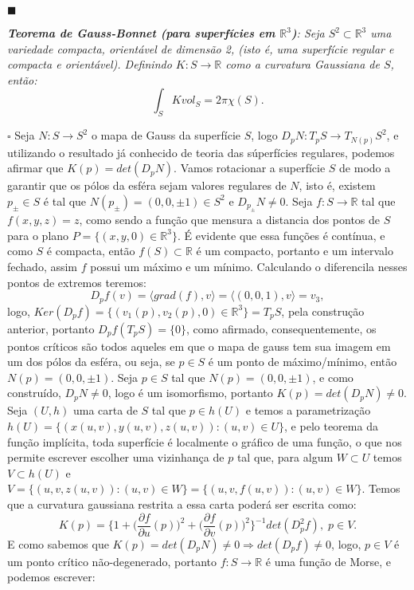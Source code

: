 \documentclass{article}
\begin{document}
	$\blacksquare$
	
	\vspace{2mm}
	\textit{\textbf{Teorema de Gauss-Bonnet (para superfícies em $\mathbb{R}^{3}$)}: Seja $S^{2} \subset \mathbb{R}^{3}$ uma variedade compacta, orientável de dimensão 2, (isto é, uma superfície regular e compacta e orientável). Definindo $K:S \to \mathbb{R}$ como a curvatura Gaussiana de $S$, então:}
	$$
	\int_{S} K vol_{S} = 2\pi \chi(S).
	$$
	
	$\square$ Seja $N : S \to S^{2}$ o mapa de Gauss da superfície $S$, logo $D_{p}N :T_{p}S \to T_{N(p)}S^{2} $, e utilizando o resultado já conhecido de teoria das súperfícies regulares, podemos afirmar que $K(p) = det(D_{p}N)$. Vamos rotacionar a superfície $S$ de modo a garantir que os pólos da esféra sejam valores regulares de $N$, isto é, existem $p_{\pm} \in S$ é tal que $N(p_{\pm}) = (0,0,\pm 1) \in S^{2}$ e $D_{p_{\pm}}N \neq 0$. Seja $f : S \to \mathbb{R}$ tal que $f(x,y,z) = z$, como sendo a função que mensura a distancia dos pontos de $S$ para o plano $P = \{(x,y,0) \in \mathbb{R}^{3} \}$. É evidente que essa funções é contínua, e como $S$ é compacta, então $f(S) \subset \mathbb{R}$ é um compacto, portanto e um intervalo fechado, assim $f$ possui um máximo e um mínimo. Calculando o diferencila nesses pontos de extremos teremos:
	$$
	D_{p}f(v) = \langle grad(f), v\rangle = \langle (0,0,1), v\rangle = v_{3}, 
	$$
	logo, $Ker(D_{p}f) = \{(v_{1}(p), v_{2}(p), 0) \in \mathbb{R}^{3} \} = T_{p}S$, pela construção anterior, portanto $D_{p}f(T_{p}S)  = \{0\}$, como afirmado, consequentemente, os pontos críticos são todos aqueles em que o mapa de gauss tem sua imagem em um dos pólos da esféra, ou seja, se $p \in S$ é um ponto de máximo/mínimo, então $N(p) = (0,0,\pm 1)$. Seja $p \in S$ tal que $N(p) = (0,0,\pm 1)$, e como construído, $D_{p}N \neq 0$, logo é um isomorfismo, portanto $K(p) = det(D_{p}N) \neq 0$. Seja $(U, h)$ uma carta de $S$ tal que $p \in h(U)$ e temos a parametrização $h(U) = \{(x(u,v), y(u,v), z(u,v)): (u,v ) \in U \}$, e pelo teorema da função implícita, toda superfície é localmente o gráfico de uma função, o que nos permite escrever escolher uma vizinhança de $p$ tal que, para algum $W \subset U$ temos $V \subset h(U)$ e $V=\{(u, v , z(u,v)): (u,v) \in W\} = \{(u, v , f(u,v)): (u,v) \in W\}$. Temos que a curvatura gaussiana restrita a essa carta poderá ser escrita como:
	$$
	K(p) = \Big\{1+ \Big(\frac{\partial f}{\partial u}(p)\Big)^{2} + \Big(\frac{\partial f}{\partial v}(p)\Big)^{2} \Big\}^{-1} det(D_{p}^{2}f), \; p \in V.
	$$
	E como sabemos que $K(p) = det(D_{p}N) \neq 0 \Rightarrow  det(D_{p}f) \neq 0$, logo, $p \in V$ é um ponto crítico não-degenerado, portanto $f: S \to \mathbb{R}$ é uma função de Morse, e podemos escrever:
\end{document}
